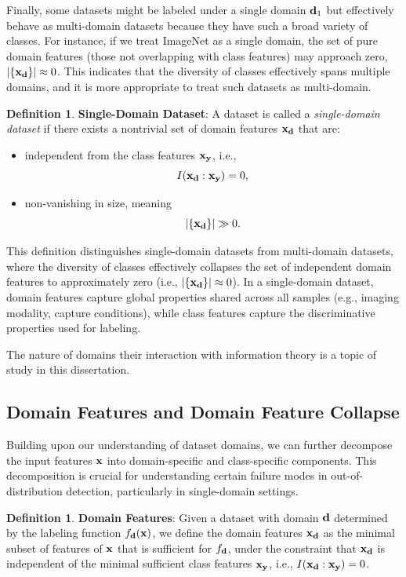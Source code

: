 \documentclass[11pt, oneside]{book}
\theoremstyle{plain}
\theoremstyle{definition}
\newtheorem{definition}[theorem]{Definition}
\theoremstyle{remark}
\begin{document}
Finally, some datasets might be labeled under a single domain \( {\mathbf{d}}_1 \) but effectively behave as multi-domain datasets because they have such a broad variety of classes. For instance, if we treat ImageNet as a single domain, the set of pure domain features (those not overlapping with class features) may approach zero, \( |\{{\mathbf{x}}_{{\mathbf{d}}}\}| \approx 0 \). This indicates that the diversity of classes effectively spans multiple domains, and it is more appropriate to treat such datasets as multi-domain.


\begin{definition}
\textbf{Single-Domain Dataset}:  
A dataset is called a \emph{single-domain dataset} if there exists a nontrivial set of domain features \( {\mathbf{x}}_{{\mathbf{d}}} \) that are:
\begin{itemize}
    \item independent from the class features \( {\mathbf{x}}_{{\mathbf{y}}} \), i.e., 
    \[
    I({\mathbf{x}}_{{\mathbf{d}}} : {\mathbf{x}}_{{\mathbf{y}}}) = 0,
    \]
    \item non-vanishing in size, meaning 
    \[
    |\{{\mathbf{x}}_{{\mathbf{d}}}\}| \gg 0.
    \]
\end{itemize}
This definition distinguishes single-domain datasets from multi-domain datasets, where the diversity of classes effectively collapses the set of independent domain features to approximately zero (i.e., \( |\{{\mathbf{x}}_{{\mathbf{d}}}\}| \approx 0 \)). In a single-domain dataset, domain features capture global properties shared across all samples (e.g., imaging modality, capture conditions), while class features capture the discriminative properties used for labeling.
\label{def:singledomain}
\end{definition}

The nature of domains their interaction with information theory is a topic of study in this dissertation.

\subsection{Domain Features and Domain Feature Collapse}

Building upon our understanding of dataset domains, we can further decompose the input features ${\mathbf{x}}$ into domain-specific and class-specific components. This decomposition is crucial for understanding certain failure modes in out-of-distribution detection, particularly in single-domain settings.

\begin{definition}
\textbf{Domain Features}: Given a dataset with domain ${\mathbf{d}}$ determined by the labeling function $f_{{\mathbf{d}}}({\mathbf{x}})$, we define the domain features ${\mathbf{x}}_{\mathbf{d}}$ as the minimal subset of features of ${\mathbf{x}}$ that is sufficient for $f_{{\mathbf{d}}}$, under the constraint that ${\mathbf{x}}_{\mathbf{d}}$ is independent of the minimal sufficient class features ${\mathbf{x}}_{\mathbf{y}}$, i.e., $I({\mathbf{x}}_{\mathbf{d}} : {\mathbf{x}}_{\mathbf{y}}) = 0$.
\label{def:domainfeatures}
\end{definition}
\end{document}
